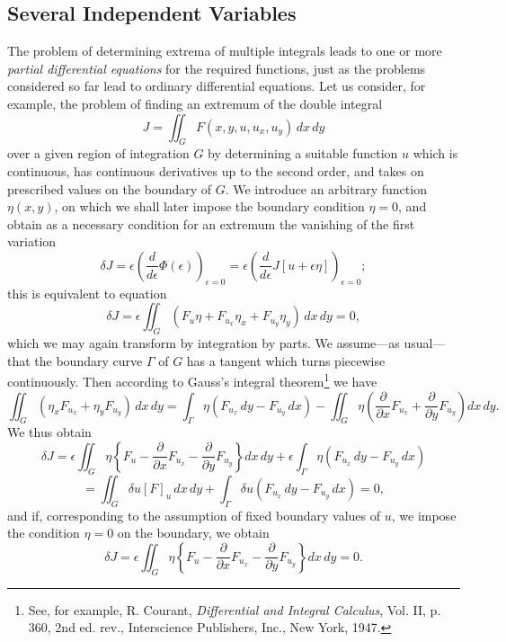 \subsection{Several Independent Variables}
The problem of determining extrema of multiple integrals leads to one or more \emph{partial differential equations} for the required functions, just as the problems considered so far lead to ordinary differential equations. Let us consider, for example, the problem of finding an extremum of the double integral
\begin{equation}\tag{22}
J=\iint_G F(x,y,u,u_x,u_y)\,dx\,dy
\end{equation}
over a given region of integration $G$ by determining a suitable function $u$ which is continuous, has continuous derivatives up to the second order, and takes on prescribed values on the boundary of $G$. We introduce an arbitrary function $\eta(x,y)$, on which we shall later impose the boundary condition $\eta=0$, and obtain as a necessary condition for an extremum the vanishing of the first variation
\[
\delta J=\epsilon\left(\frac{d}{d\epsilon}\Phi(\epsilon)\right)_{\epsilon=0}
=\epsilon\left(\frac{d}{d\epsilon}J[u+\epsilon\eta]\right)_{\epsilon=0};
\]
this is equivalent to equation
\begin{equation}\tag{23}
\delta J=\epsilon\iint_G(F_u\eta+F_{u_x}\eta_x+F_{u_y}\eta_y)\,dx\,dy=0,
\end{equation}
which we may again transform by integration by parts. We assume---as usual---that the boundary curve $\Gamma$ of $G$ has a tangent which turns piecewise continuously. Then according to Gauss's integral theorem\footnote{See, for example, R. Courant, \emph{Differential and Integral Calculus}, Vol. II, p. 360, 2nd ed. rev., Interscience Publishers, Inc., New York, 1947.} we have
\[
\iint_G(\eta_xF_{u_x}+\eta_yF_{u_y})\,dx\,dy
=\int_\Gamma\eta(F_{u_x}\,dy-F_{u_y}\,dx)
-\iint_G\eta\left(\frac{\partial}{\partial x}F_{u_x}+\frac{\partial}{\partial y}F_{u_y}\right)dx\,dy.
\]
We thus obtain
\[
\delta J=\epsilon\iint_G\eta\left\{F_u-\frac{\partial}{\partial x}F_{u_x}-\frac{\partial}{\partial y}F_{u_y}\right\}dx\,dy
+\epsilon\int_\Gamma\eta(F_{u_x}\,dy-F_{u_y}\,dx)
\]
\[
=\iint_G\delta u[F]_u\,dx\,dy+\int_\Gamma\delta u(F_{u_x}\,dy-F_{u_y}\,dx)=0,
\]
and if, corresponding to the assumption of fixed boundary values of $u$, we impose the condition $\eta=0$ on the boundary, we obtain
\begin{equation}\tag{24}
\delta J=\epsilon\iint_G\eta\left\{F_u-\frac{\partial}{\partial x}F_{u_x}-\frac{\partial}{\partial y}F_{u_y}\right\}dx\,dy=0.
\end{equation}
